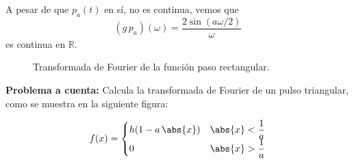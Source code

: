 A pesar de que $p_{a}(t)$ en sí, no es continua, vemos que
\begin{equation}
(g \, p_{a})(\omega) = \dfrac{2 \sin (a \omega/2)}{\omega}
\label{eq:ecuacion_06_11_Beerends}
\end{equation}
es continua en $\mathbb{R}$.
\begin{figure}[H]
\centering

\caption{Transformada de Fourier de la función paso rectangular.}
\label{fig:figura_Tfuncionpaso}
\end{figure}
\textbf{Problema a cuenta: } Calcula la transformada de Fourier de un pulso triangular, como se muestra en la siguiente figura:
\begin{figure}[H]
    \centering
    
\end{figure}
\begin{align*}
f(x) = \begin{cases}
h(1 - a \, \abs{x}) & \abs{x} < \dfrac{1}{a} \\
0 & \abs{x} > \dfrac{1}{a}
\end{cases}
\end{align*}
